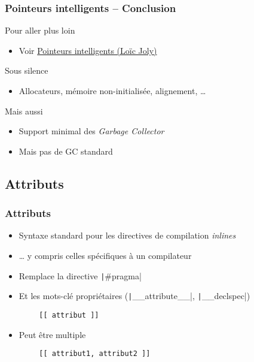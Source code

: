 \documentclass[C++.tex]{subfiles}
\begin{document}
\begin{frame}[fragile]
	\frametitle{Pointeurs intelligents -- Conclusion}
	\begin{block}{Pour aller plus loin}
		\begin{itemize}
			\item Voir \href{http://loic-joly.developpez.com/tutoriels/cpp/smart-pointers/}{Pointeurs intelligents (Loïc Joly)}
		\end{itemize}
	\end{block}

	\begin{block}{Sous silence}
		\begin{itemize}
			\item Allocateurs, mémoire non-initialisée, alignement, \ldots{}
		\end{itemize} 
	\end{block}

	\begin{block}{Mais aussi}
		\begin{itemize}
			\item Support minimal des \textit{Garbage Collector}


			\item Mais pas de GC standard
		\end{itemize}
	\end{block}
\end{frame}

\subsection*{Attributs}
\begin{frame}[fragile]
	\frametitle{Attributs}
	\begin{itemize}
		\item Syntaxe standard pour les directives de compilation \textit{inlines}
		\item \ldots{} y compris celles spécifiques à un compilateur
		\item Remplace la directive \texttt|#pragma|
		\item Et les mots-clé propriétaires (\texttt|__attribute__|, \texttt|__declspec|)
	\end{itemize}

	\begin{verbatim}
		[[ attribut ]]
	\end{verbatim}

	\begin{itemize}
		\item Peut être multiple
	\end{itemize}

	\begin{verbatim}
		[[ attribut1, attribut2 ]]
	\end{verbatim}
\end{frame}
\end{document}
